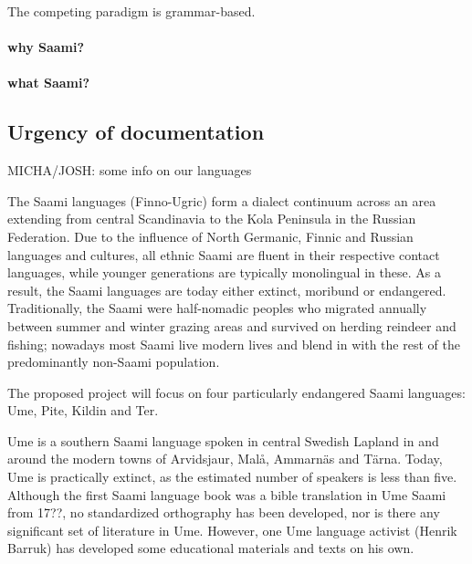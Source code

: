 \documentclass[a4paper,12pt]{article}
\begin{document}
The competing paradigm is grammar-based. 



\paragraph{why Saami?}

\paragraph{what Saami?}

\subsection{Urgency of documentation}
MICHA/JOSH: some info on our languages  

The Saami languages (Finno-Ugric) form a dialect continuum across an area extending from central Scandinavia to the Kola Peninsula in the Russian Federation. Due to the influence of North Germanic, Finnic and Russian languages and cultures, all ethnic Saami are fluent in their respective contact languages, while younger generations are typically monolingual in these. As a result, the Saami languages are today either extinct, moribund or endangered. Traditionally, the Saami were half-nomadic peoples who migrated annually between summer and winter grazing areas and survived on herding reindeer and fishing; nowadays most Saami live modern lives and blend in with the rest of the predominantly non-Saami population.

The proposed project will focus on four particularly endangered Saami languages: Ume, Pite, Kildin and Ter.

Ume is a southern Saami language spoken in central Swedish Lapland in and around the modern towns of Arvidsjaur, Malå, Ammarnäs and Tärna. Today, Ume is practically extinct, as the estimated number of speakers is less than five. %
Although the first Saami language book was a bible translation in Ume Saami from 17??, %
no standardized orthography has been developed, nor is there any significant set of literature in Ume. However, one Ume language activist (Henrik Barruk) has developed some educational materials and texts on his own.
\end{document}

